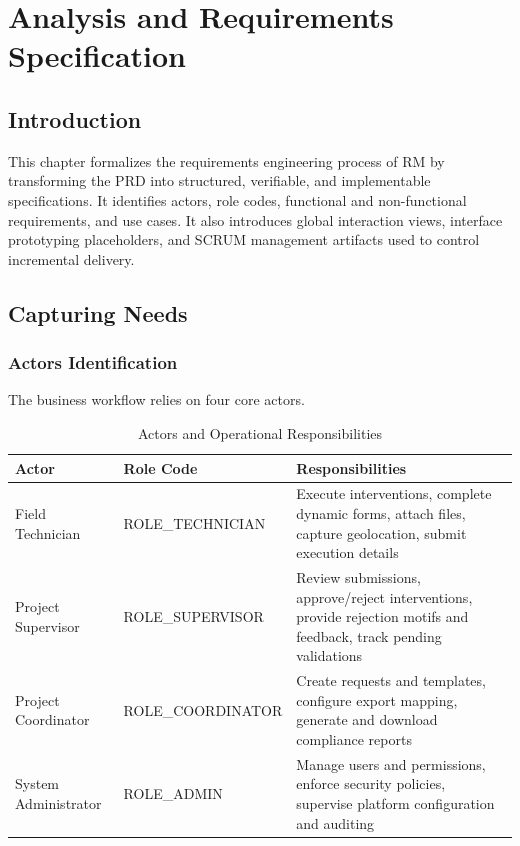 \chapter{Analysis and Requirements Specification}

\section{Introduction}

This chapter formalizes the requirements engineering process of RM by transforming the PRD into structured, verifiable, and implementable specifications. It identifies actors, role codes, functional and non-functional requirements, and use cases. It also introduces global interaction views, interface prototyping placeholders, and SCRUM management artifacts used to control incremental delivery.

\section{Capturing Needs}

\subsection{Actors Identification}

The business workflow relies on four core actors.

\begin{table}[H]
\centering
\caption{Actors and Operational Responsibilities}
\label{tab:actors_operational_responsibilities}
\begin{tabularx}{\textwidth}{|l|l|X|}
\hline
\textbf{Actor} & \textbf{Role Code} & \textbf{Responsibilities} \\
\hline
Field Technician & ROLE\_TECHNICIAN & Execute interventions, complete dynamic forms, attach files, capture geolocation, submit execution details \\
\hline
Project Supervisor & ROLE\_SUPERVISOR & Review submissions, approve/reject interventions, provide rejection motifs and feedback, track pending validations \\
\hline
Project Coordinator & ROLE\_COORDINATOR & Create requests and templates, configure export mapping, generate and download compliance reports \\
\hline
System Administrator & ROLE\_ADMIN & Manage users and permissions, enforce security policies, supervise platform configuration and auditing \\
\hline
\end{tabularx}
\end{table}

